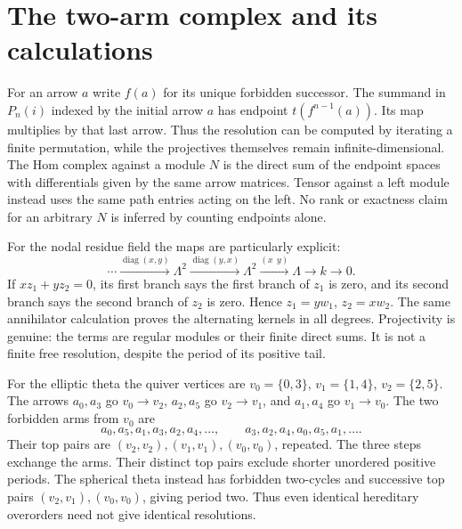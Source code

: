 \documentclass[11pt,oneside,openany]{book}
\theoremstyle{definition}\newtheorem{definition}[theorem]{Definition}
\theoremstyle{remark}\newtheorem{remark}[theorem]{Remark}
\begin{document}
\section{The two-arm complex and its calculations}
For an arrow $a$ write $f(a)$ for its unique forbidden successor. The summand in $P_n(i)$ indexed by the initial arrow $a$ has endpoint $t(f^{n-1}(a))$. Its map multiplies by that last arrow. Thus the resolution can be computed by iterating a finite permutation, while the projectives themselves remain infinite-dimensional. The Hom complex against a module $N$ is the direct sum of the endpoint spaces with differentials given by the same arrow matrices. Tensor against a left module instead uses the same path entries acting on the left. No rank or exactness claim for an arbitrary $N$ is inferred by counting endpoints alone.

For the nodal residue field the maps are particularly explicit:
\[
 \cdots\xrightarrow{\operatorname{diag}(x,y)}\Lambda^2
 \xrightarrow{\operatorname{diag}(y,x)}\Lambda^2
 \xrightarrow{(x\ \ y)}\Lambda\longrightarrow k\longrightarrow0.
\]
If $xz_1+yz_2=0$, its first branch says the first branch of $z_1$ is zero, and its second branch says the second branch of $z_2$ is zero. Hence $z_1=yw_1$, $z_2=xw_2$. The same annihilator calculation proves the alternating kernels in all degrees. Projectivity is genuine: the terms are regular modules or their finite direct sums. It is not a finite free resolution, despite the period of its positive tail.

For the elliptic theta the quiver vertices are $v_0=\{0,3\}$, $v_1=\{1,4\}$, $v_2=\{2,5\}$. The arrows $a_0,a_3$ go $v_0\to v_2$, $a_2,a_5$ go $v_2\to v_1$, and $a_1,a_4$ go $v_1\to v_0$. The two forbidden arms from $v_0$ are
\[
 a_0,a_5,a_1,a_3,a_2,a_4,\ldots,\qquad
 a_3,a_2,a_4,a_0,a_5,a_1,\ldots.
\]
Their top pairs are $(v_2,v_2),(v_1,v_1),(v_0,v_0)$, repeated. The three steps exchange the arms. Their distinct top pairs exclude shorter unordered positive periods. The spherical theta instead has forbidden two-cycles and successive top pairs $(v_2,v_1),(v_0,v_0)$, giving period two. Thus even identical hereditary overorders need not give identical resolutions.
\end{document}
